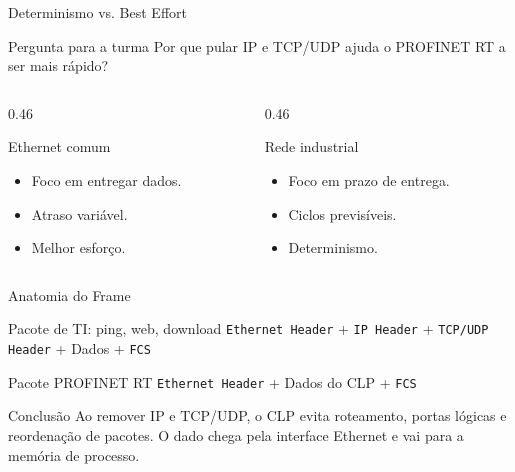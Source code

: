 \documentclass[10pt, aspectratio=169]{beamer}
\begin{document}
\begin{frame}{Determinismo vs. Best Effort}
    \small
    \begin{block}{Pergunta para a turma}
        Por que pular IP e TCP/UDP ajuda o PROFINET RT a ser mais r\'apido?
    \end{block}

    \begin{columns}[T,totalwidth=\textwidth]
        \begin{column}{0.46\textwidth}
            \begin{block}{Ethernet comum}
                \begin{itemize}
                    \item Foco em entregar dados.
                    \item Atraso vari\'avel.
                    \item Melhor esfor\c{c}o.
                \end{itemize}
            \end{block}
        \end{column}
        \begin{column}{0.46\textwidth}
            \begin{block}{Rede industrial}
                \begin{itemize}
                    \item Foco em prazo de entrega.
                    \item Ciclos previs\'iveis.
                    \item Determinismo.
                \end{itemize}
            \end{block}
        \end{column}
    \end{columns}
\end{frame}

\begin{frame}{Anatomia do Frame}
    \small
    \begin{block}{Pacote de TI: ping, web, download}
        \texttt{Ethernet Header} + \texttt{IP Header} + \texttt{TCP/UDP Header} + Dados + \texttt{FCS}
    \end{block}

    \begin{block}{Pacote PROFINET RT}
        \texttt{Ethernet Header} + Dados do CLP + \texttt{FCS}
    \end{block}

    \begin{block}{Conclus\~ao}
        Ao remover IP e TCP/UDP, o CLP evita roteamento, portas l\'ogicas e reordena\c{c}\~ao de pacotes. O dado chega pela interface Ethernet e vai para a mem\'oria de processo.
    \end{block}
\end{frame}
\end{document}
